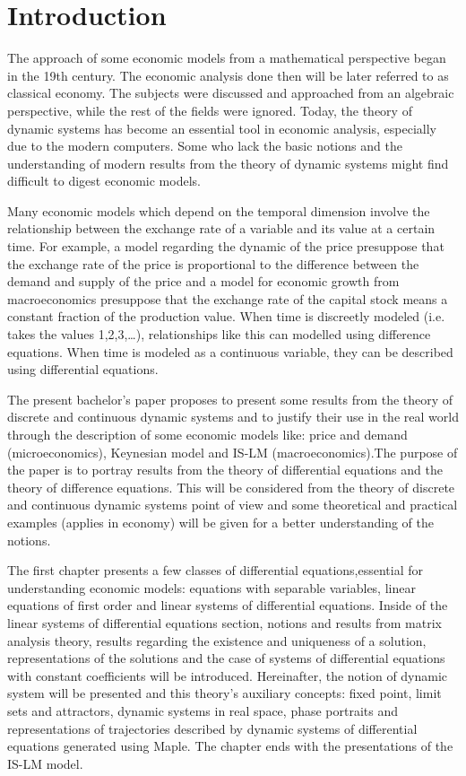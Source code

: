 \documentclass[a4paper,11pt]{report}
\begin{document}
\chapter*{Introduction}
 The approach of some economic models from a mathematical perspective began in the 19th century. The economic analysis done then will be later referred to as classical economy. The subjects were discussed and approached from an algebraic perspective, while the rest of the fields were ignored. Today, the theory of dynamic systems has become an essential tool in economic analysis, especially due to the modern computers. Some who lack the basic notions and the understanding of modern results from the theory of dynamic systems might find difficult to digest economic models. \par
 Many economic models which depend on the temporal dimension involve the relationship between the exchange rate of a variable and its value at a certain time. For example, a model regarding the dynamic of the price presuppose that the exchange rate of the price is proportional to the difference between the demand and supply of the price and a model for economic growth from macroeconomics presuppose that the exchange rate of the capital stock means a constant fraction of the production value. When time is discreetly modeled (i.e. takes the values 1,2,3,…), relationships like this can modelled using difference equations. When time is modeled as a continuous variable, they can be described using differential equations.\par 
The present bachelor’s paper proposes to present some results from the theory of discrete and continuous dynamic systems and to justify their use in the real world through the description of some economic models like: price and demand (microeconomics), Keynesian model and IS-LM (macroeconomics).The purpose of the paper is to portray results from the theory of differential equations and the theory of difference equations. This will be considered from the theory of discrete and continuous dynamic systems point of view and some theoretical and practical examples (applies in economy) will be given for a better understanding of the notions.\par
The first chapter presents a few classes of differential equations,essential for understanding economic models: equations with separable variables, linear equations of first order and linear systems of differential equations. Inside of the linear systems of differential equations section, notions and results from matrix analysis theory, results regarding the existence and uniqueness of a solution, representations of the solutions and the case of systems of differential equations with constant coefficients will be introduced. Hereinafter, the notion of dynamic system will be presented and this theory’s auxiliary concepts: fixed point, limit sets and attractors, dynamic systems in real space, phase portraits and representations of trajectories described by  dynamic systems of differential equations generated using Maple. The chapter ends with the presentations of the IS-LM model.\par
\end{document}
